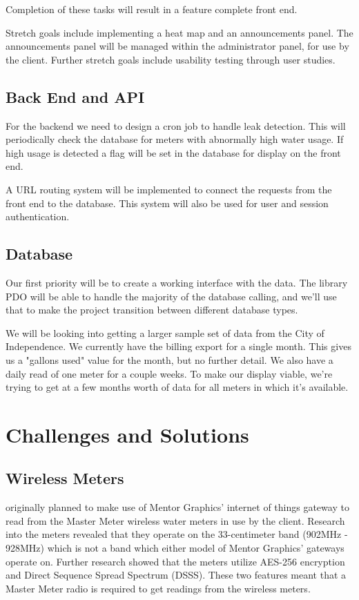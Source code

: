 \documentclass[journal]{IEEEtran}
\begin{document}
Completion of these tasks will result in a feature complete front end.

Stretch goals include implementing a heat map and an announcements panel. The announcements panel will be managed within the administrator panel, for use by the client. Further stretch goals include usability testing through user studies.


\subsection{Back End and API} \label{future:back}
For the backend we need to design a cron job to handle leak detection. This will periodically check the database for meters with abnormally high water usage. If high usage is detected a flag will be set in the database for display on the front end.

A URL routing system will be implemented to connect the requests from the front end to the database. This system will also be used for user and session authentication.

\subsection{Database}
Our first priority will be to create a working interface with the data. The library PDO will be able to handle the majority of the database calling, and we'll use that to make the project transition between different database types.

We will be looking into getting a larger sample set of data from the City of Independence. We currently have the billing export for a single month. This gives us a "gallons used" value for the month, but no further detail. We also have a daily read of one meter for a couple weeks. To make our display viable, we're trying to get at a few months worth of data for all meters in which it's available.

\section{Challenges and Solutions}
\subsection{Wireless Meters}
 originally planned to make use of Mentor Graphics' internet of things gateway to read from the Master Meter wireless water meters in use by the client. Research into the meters revealed that they operate on the 33-centimeter band (902MHz - 928MHz) which is not a band which either model of Mentor Graphics' gateways operate on. Further research showed that the meters utilize AES-256 encryption and Direct Sequence Spread Spectrum (DSSS). These two features meant that a Master Meter radio is required to get readings from the wireless meters.
\end{document}
